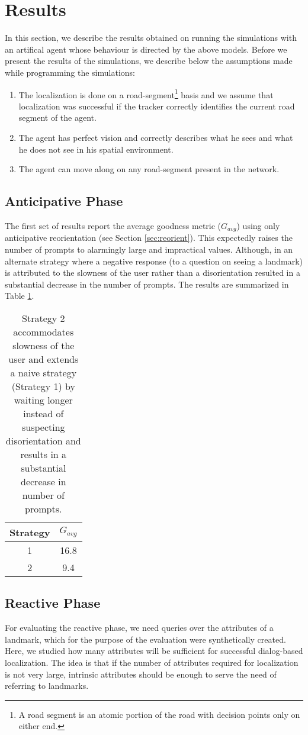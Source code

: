 \documentclass{iitkthesis}
\begin{document}
 \section{Results} 
In this section, we describe the results obtained on running the 
simulations with an artifical agent whose behaviour is directed 
by the above models.
Before we present the results of the simulations, we describe below the 
assumptions made while programming the simulations:
 \begin{enumerate}
   \item The localization is done on a road-segment\footnote{A road 
segment is an atomic portion of the road with decision points
only on either end.} basis and we assume that 
localization was successful if the tracker correctly identifies the 
current road segment of the agent.
   \item The agent has perfect vision and correctly describes what he 
sees and what he does not see in his spatial environment.
   \item The agent can move along on any road-segment present in the 
network. 
 \end{enumerate}
 \subsection*{Anticipative Phase}
The first set of results report the average goodness metric ($G_{avg}$) 
using only anticipative reorientation (see Section 
\ref{sec:reorient}). This expectedly raises 
the number of prompts to alarmingly large and impractical values. 
Although, in an alternate strategy where a negative response (to 
a question on seeing a landmark) is attributed to the slowness of the user 
rather than a disorientation resulted in a substantial decrease in the 
number of prompts.  The results are summarized in Table \ref{table:st}.
\begin{table}[h]
\center
\begin{tabular}{|c|c|}
\hline
\textbf{Strategy} & $G_{avg}$ \\ \hline
1 & 16.8 \\ \hline
2 & 9.4\\ \hline
\end{tabular}
\caption{Strategy 2 accommodates slowness of the user and extends a naive strategy (Strategy 1) by waiting longer instead of suspecting disorientation and results in a substantial decrease in number of prompts.}
\label{table:st}
\end{table}
\subsection*{Reactive Phase}
For evaluating the reactive phase, we need queries over the attributes of 
a landmark, which for the purpose of the evaluation were synthetically 
created. Here, we studied how many attributes will be sufficient 
for successful dialog-based localization. The idea is that if the 
number of attributes required for localization is not very large, 
intrinsic attributes should be enough to serve the need of referring to 
landmarks.
\end{document}
